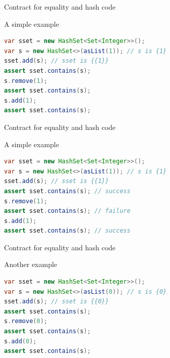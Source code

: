 \documentclass[10pt,usenames,dvipsnames]{beamer}
\begin{document}

\begin{frame}[fragile]{Contract for equality and hash code}
  \begin{block}{A simple example}
    \begin{lstlisting}[language=Java]
var sset = new HashSet<Set<Integer>>();
var s = new HashSet<>(asList(1)); // s is {1}
sset.add(s); // sset is {{1}}
assert sset.contains(s); 
s.remove(1);
assert sset.contains(s); 
s.add(1);
assert sset.contains(s); 
    \end{lstlisting}
  \end{block}
\end{frame}


\begin{frame}[fragile]{Contract for equality and hash code}
  \begin{block}{A simple example}
    \begin{lstlisting}[language=Java]
var sset = new HashSet<Set<Integer>>();
var s = new HashSet<>(asList(1)); // s is {1}
sset.add(s); // sset is {{1}}
assert sset.contains(s); // success
s.remove(1);
assert sset.contains(s); // failure
s.add(1);
assert sset.contains(s); // success
    \end{lstlisting}
  \end{block}
\end{frame}


\begin{frame}[fragile]{Contract for equality and hash code}
  \begin{block}{Another example}
    \begin{lstlisting}[language=Java]
var sset = new HashSet<Set<Integer>>();
var s = new HashSet<>(asList(0)); // s is {0}
sset.add(s); // sset is {{0}}
assert sset.contains(s); 
s.remove(0);
assert sset.contains(s); 
s.add(0);
assert sset.contains(s); 
    \end{lstlisting}
  \end{block}
\end{frame}

\end{document}
